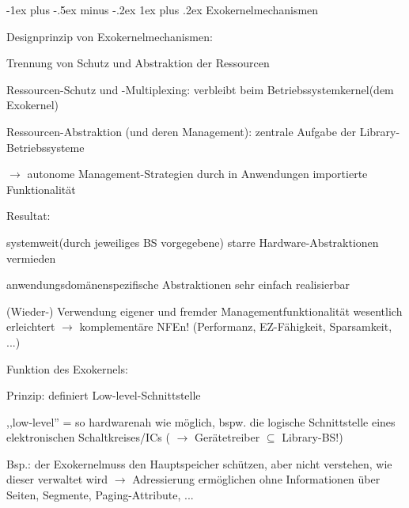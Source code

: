 \documentclass[a4paper]{article}
\makeatletter
\renewcommand{\subsubsection}{\@startsection{subsubsection}{3}{0mm}%
 {-1ex plus -.5ex minus -.2ex}%
 {1ex plus .2ex}%
 {\normalfont\small\bfseries}}
\makeatother
\begin{document}
\begin{multicols}{3}
    \subsubsection{Exokernelmechanismen}

    \begin{itemize*}
        \item
        Designprinzip von Exokernelmechanismen:
        \begin{itemize*}
            \item Trennung von Schutz und Abstraktion der Ressourcen
            \item Ressourcen-Schutz und -Multiplexing: verbleibt beim Betriebssystemkernel(dem Exokernel)
            \item Ressourcen-Abstraktion (und deren Management): zentrale Aufgabe der Library-Betriebssysteme \begin{itemize*} \item $\rightarrow$ autonome Management-Strategien durch in Anwendungen importierte Funktionalität \end{itemize*}
            \item Resultat: \begin{enumerate*} \item systemweit(durch jeweiliges BS vorgegebene) starre Hardware-Abstraktionen vermieden \item anwendungsdomänenspezifische Abstraktionen sehr einfach realisierbar \item (Wieder-) Verwendung eigener und fremder Managementfunktionalität wesentlich erleichtert $\rightarrow$ komplementäre NFEn! (Performanz, EZ-Fähigkeit, Sparsamkeit, ...) \end{enumerate*}
        \end{itemize*}
        \item
        Funktion des Exokernels:
        \begin{itemize*}
            \item Prinzip: definiert Low-level-Schnittstelle \begin{itemize*} \item ,,low-level'' = so hardwarenah wie möglich, bspw. die logische Schnittstelle eines elektronischen Schaltkreises/ICs ( $\rightarrow$ Gerätetreiber $\subseteq$ Library-BS!) \item Bsp.: der Exokernelmuss den Hauptspeicher schützen, aber nicht verstehen, wie dieser verwaltet wird $\rightarrow$ Adressierung ermöglichen ohne Informationen über Seiten, Segmente, Paging-Attribute, ... \end{itemize*}

\end{itemize*}
\end{itemize*}
\end{multicols}
\end{document}
